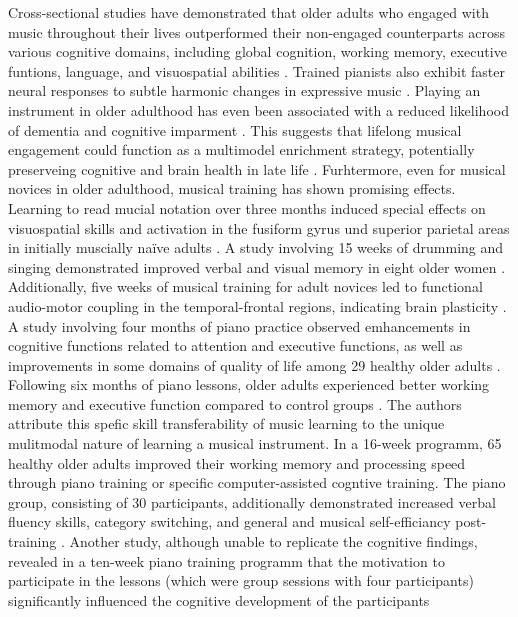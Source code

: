Cross-sectional studies have demonstrated that older adults who engaged with music throughout their lives outperformed their non-engaged counterparts across various cognitive domains, including global cognition, working memory, executive funtions, language, and visuospatial abilities \cite{Hanna-Pladdy2011, Hanna-Pladdy2012}. Trained pianists also exhibit faster neural responses to subtle harmonic changes in expressive music \cite{James2008}. Playing an instrument in older adulthood has even been associated with a reduced likelihood of dementia and cognitive imparment \cite{Balbag2014}. This suggests that lifelong musical engagement could function as a multimodel enrichment strategy, potentially preserveing cognitive and brain health in late life \cite{Bottcher2022}. 
Furhtermore, even for musical novices in older adulthood, musical training has shown promising effects. Learning to read mucial notation over three months induced special effects on visuospatial skills and activation in the fusiform gyrus und superior parietal areas in initially muscially naïve adults \cite{Stewart2003}. A study involving 15 weeks of drumming and singing demonstrated improved verbal and visual memory in eight older women \cite{Dege2018}. Additionally, five weeks of musical training for adult novices led to functional audio-motor coupling in the temporal-frontal regions, indicating brain plasticity \cite{Lappe2008, Bangert2003}. A study involving four months of piano practice observed emhancements in cognitive functions related to attention and executive functions, as well as improvements in some domains of quality of life among 29 healthy older adults \cite{Seinfeld2013}. Following six months of piano lessons, older adults experienced better working memory and executive function compared to control groups  \cite{Bugos2007}. The authors attribute this spefic skill transferability of music learning to the unique mulitmodal nature of learning a musical instrument. In a 16-week programm, 65 healthy older adults improved their working memory and processing speed through piano training or specific computer-assisted cogntive training. The piano group, consisting of 30 participants, additionally demonstrated increased verbal fluency skills, category switching, and general and musical self-efficiancy post-training \cite{Bugos2022}. Another study, although unable to replicate the cognitive findings, revealed in a ten-week piano training programm that the motivation to participate in the lessons (which were group sessions with four participants) significantly influenced the cognitive development of the participants \cite{Macritchie2020}

